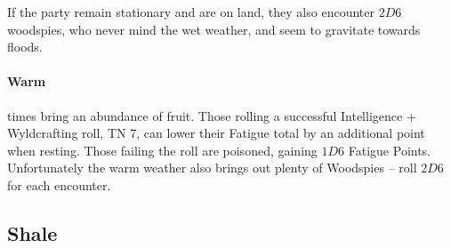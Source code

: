 \begin{multicols}{2}
{If the party remain stationary and are on land, they also encounter $2D6$ woodspies, who never mind the wet weather, and seem to gravitate towards floods.

\paragraph{Warm} times bring an abundance of fruit.
Those rolling a successful Intelligence + Wyldcrafting roll, TN 7, can lower their Fatigue total by an additional point when resting.
Those failing the roll are poisoned, gaining $1D6$ Fatigue Points.
Unfortunately the warm weather also brings out plenty of Woodspies -- roll $2D6$ for each encounter.

}

\subsection{Shale}


\iftoggle{players}{}{

  \begin{figure*}[t!]
  \begin{nametable}[c||L|L|L|L|L|L|L|L,fontupper=\footnotesize,]{Encounter in Shale}


\end{nametable}
\end{figure*}}
\end{multicols}
